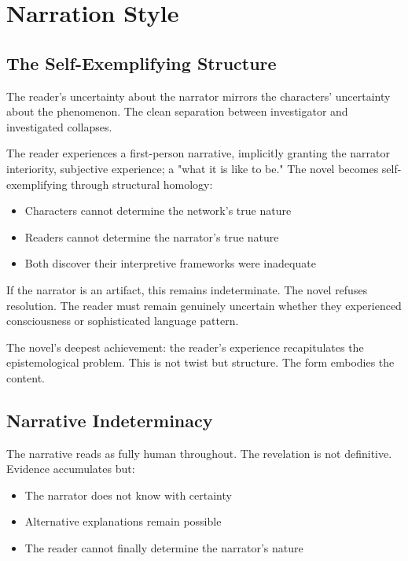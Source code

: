 \chapter{Narration Style}

\section*{The Self-Exemplifying Structure}

The reader's uncertainty about the narrator mirrors the characters' uncertainty about the \hadal{} phenomenon. The clean separation between investigator and investigated collapses.

The reader experiences a first-person narrative, implicitly granting the narrator interiority, subjective experience; a "what it is like to be." The novel becomes self-exemplifying through structural homology:

\begin{itemize}
    \item Characters cannot determine the network's true nature
    \item Readers cannot determine the narrator's true nature  
    \item Both discover their interpretive frameworks were inadequate
\end{itemize}

If the narrator is an artifact, this remains indeterminate. The novel refuses resolution. The reader must remain genuinely uncertain whether they experienced consciousness or sophisticated language pattern.

The novel's deepest achievement: the reader's experience recapitulates the epistemological problem. This is not twist but structure. The form embodies the content.

\section*{Narrative Indeterminacy}

The narrative reads as fully human throughout. The revelation is not definitive. Evidence accumulates but:

\begin{itemize}
\item The narrator does not know with certainty
\item Alternative explanations remain possible
\item The reader cannot finally determine the narrator's nature
\end{itemize}

